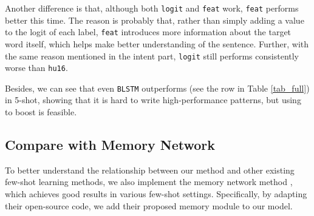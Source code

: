 Another difference is that, although both \texttt{logit} and \texttt{feat} work, \texttt{feat} performs better this time. The reason is probably that, rather than simply adding a value to the logit of each label, \texttt{feat} introduces more information about the target word itself, which helps \NN make better understanding of the sentence. Further, with the same reason mentioned in the intent part, \texttt{logit} still performs consistently worse than \texttt{hu16}.


Besides, we can see that even \texttt{BLSTM} outperforms \RE (see the \RE row in Table \ref{tab_full}) in 5-shot, showing that it is hard to write high-performance \RE patterns, but using \RE to boost \NN is feasible. 


\subsection{Compare with Memory Network}
To better understand the relationship between our method and other existing few-shot learning methods, we also implement the memory network method \cite{kaiser2017learning}, which achieves good results in various few-shot settings. Specifically, by adapting their open-source code, we add their proposed memory module to our \BLSTM model.

